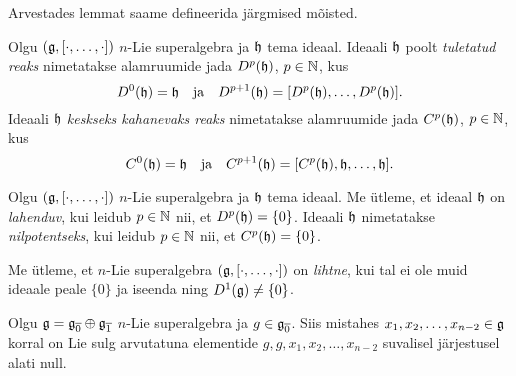 Arvestades lemmat saame defineerida järgmised mõisted.

\begin{dfn}
    Olgu $(\mathfrak{g}, [\cdot, \dots, \cdot])$ $n$-Lie superalgebra ja $\mathfrak{h}$
    tema ideaal. Ideaali $\mathfrak{h}$ poolt \emph{tuletatud reaks} nimetatakse
    alamruumide jada $D^p(\mathfrak{h})$, $p \in \mathbb{N}$, kus
    \[
        D^0(\mathfrak{h}) = \mathfrak{h} \quad \text{ja} \quad
        D^{p+1}(\mathfrak{h}) = [D^p(\mathfrak{h}), \dots, D^p(\mathfrak{h})].
    \]
    Ideaali $\mathfrak{h}$ \emph{keskseks kahanevaks reaks} nimetatakse
    alamruumide jada $C^p(\mathfrak{h})$, $p \in \mathbb{N}$, kus
    \[
        C^0(\mathfrak{h}) = \mathfrak{h} \quad \text{ja} \quad
        C^{p+1}(\mathfrak{h}) = [C^p(\mathfrak{h}), \mathfrak{h}, \dots, \mathfrak{h}].
    \]
\end{dfn}

\begin{dfn}
    Olgu $(\mathfrak{g}, [\cdot, \dots, \cdot])$ $n$-Lie superalgebra ja $\mathfrak{h}$
    tema ideaal. Me ütleme, et ideaal $\mathfrak{h}$ on \emph{lahenduv}, kui
    leidub $p \in \mathbb{N}$ nii, et $D^p(\mathfrak{h}) = \{0\}$. Ideaali $\mathfrak{h}$
    nimetatakse \emph{nilpotentseks}, kui leidub $p \in \mathbb{N}$
    nii, et $C^p(\mathfrak{h}) = \{0\}$.
\end{dfn}

\begin{dfn}
    Me ütleme, et $n$-Lie superalgebra $(\mathfrak{g}, [\cdot, \dots, \cdot])$
    on \emph{lihtne}, kui tal ei ole muid ideaale peale $\{0\}$
    ja iseenda ning $D^1(\mathfrak{g}) \neq \{0\}$.
\end{dfn}

\begin{lemma}
    Olgu $\mathfrak{g} = \mathfrak{g}_{\overline{0}} \oplus \mathfrak{g}_{\overline{1}}$
    $n$-Lie superalgebra ja $g \in \mathfrak{g}_{\overline{0}}$. Siis
    mistahes $x_1, x_2, \dots, x_{n-2} \in \mathfrak{g}$ korral on
    Lie sulg arvutatuna elementide $g, g, x_1, x_2, \dots, x_{n-2}$
    suvalisel järjestusel alati null.
\end{lemma}

